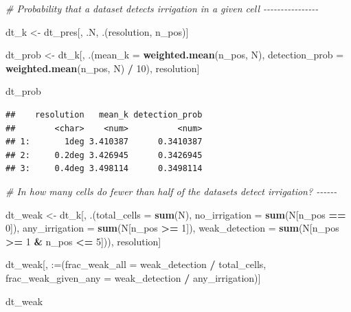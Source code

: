 \documentclass[
  11pt,
]{article}
\newenvironment{Shaded}{\begin{snugshade}}{\end{snugshade}}
\newcommand{\AttributeTok}[1]{\textcolor[rgb]{0.13,0.29,0.53}{#1}}
\newcommand{\CommentTok}[1]{\textcolor[rgb]{0.56,0.35,0.01}{\textit{#1}}}
\newcommand{\DecValTok}[1]{\textcolor[rgb]{0.00,0.00,0.81}{#1}}
\newcommand{\FunctionTok}[1]{\textcolor[rgb]{0.13,0.29,0.53}{\textbf{#1}}}
\newcommand{\NormalTok}[1]{#1}
\newcommand{\OtherTok}[1]{\textcolor[rgb]{0.56,0.35,0.01}{#1}}
\newcommand{\SpecialCharTok}[1]{\textcolor[rgb]{0.81,0.36,0.00}{\textbf{#1}}}
\newcommand{\StringTok}[1]{\textcolor[rgb]{0.31,0.60,0.02}{#1}}
\begin{document}
\begin{Shaded}
\begin{Highlighting}[]
\CommentTok{\# Probability that a dataset detects irrigation in a given cell {-}{-}{-}{-}{-}{-}{-}{-}{-}{-}{-}{-}{-}{-}{-}{-}}

\NormalTok{dt\_k }\OtherTok{\textless{}{-}}\NormalTok{ dt\_pres[, .N, .(resolution, n\_pos)]}

\NormalTok{dt\_prob }\OtherTok{\textless{}{-}}\NormalTok{ dt\_k[, .(}\AttributeTok{mean\_k =} \FunctionTok{weighted.mean}\NormalTok{(n\_pos, N),}
                    \AttributeTok{detection\_prob =} \FunctionTok{weighted.mean}\NormalTok{(n\_pos, N) }\SpecialCharTok{/} \DecValTok{10}\NormalTok{), }
\NormalTok{                resolution]}

\NormalTok{dt\_prob}
\end{Highlighting}
\end{Shaded}

\begin{verbatim}
##    resolution   mean_k detection_prob
##        <char>    <num>          <num>
## 1:       1deg 3.410387      0.3410387
## 2:     0.2deg 3.426945      0.3426945
## 3:     0.4deg 3.498114      0.3498114
\end{verbatim}

\begin{Shaded}
\begin{Highlighting}[]
\CommentTok{\# In how many cells do fewer than half of the datasets detect irrigation? {-}{-}{-}{-}{-}{-}}

\NormalTok{dt\_weak }\OtherTok{\textless{}{-}}\NormalTok{ dt\_k[, .(}\AttributeTok{total\_cells =} \FunctionTok{sum}\NormalTok{(N),}
  \AttributeTok{no\_irrigation =} \FunctionTok{sum}\NormalTok{(N[n\_pos }\SpecialCharTok{==} \DecValTok{0}\NormalTok{]),}
  \AttributeTok{any\_irrigation =} \FunctionTok{sum}\NormalTok{(N[n\_pos }\SpecialCharTok{\textgreater{}=} \DecValTok{1}\NormalTok{]),}
  \AttributeTok{weak\_detection =} \FunctionTok{sum}\NormalTok{(N[n\_pos }\SpecialCharTok{\textgreater{}=} \DecValTok{1} \SpecialCharTok{\&}\NormalTok{ n\_pos }\SpecialCharTok{\textless{}=} \DecValTok{5}\NormalTok{])), resolution]}

\NormalTok{dt\_weak[, }\StringTok{\textasciigrave{}}\AttributeTok{:=}\StringTok{\textasciigrave{}}\NormalTok{(}\AttributeTok{frac\_weak\_all =}\NormalTok{ weak\_detection }\SpecialCharTok{/}\NormalTok{ total\_cells,}
               \AttributeTok{frac\_weak\_given\_any =}\NormalTok{ weak\_detection }\SpecialCharTok{/}\NormalTok{ any\_irrigation)]}

\NormalTok{dt\_weak}
\end{Highlighting}
\end{Shaded}
\end{document}

